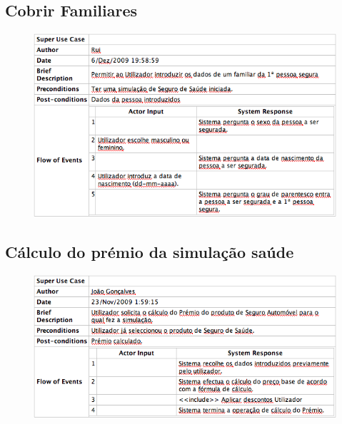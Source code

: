 \pagebreak

\subsection{Cobrir Familiares}
\begin{figure}[!htb]
	\centering
	\includegraphics[scale=0.6]{images/Prints/RealizacaoSeguroSaude/CobrirFamiliares.png}
\end{figure}

\subsection{Cálculo do prémio da simulação saúde}
\begin{figure}[!htb]
	\centering
	\includegraphics[scale=0.6]{images/Prints/RealizacaoSeguroSaude/CalcularPremio.png}
\end{figure}

\pagebreak

